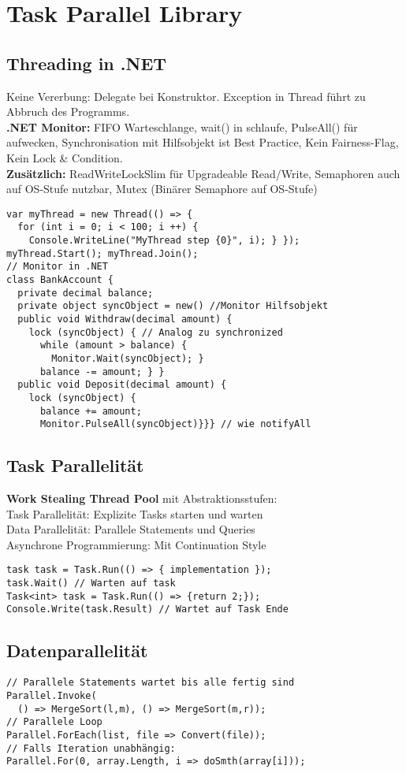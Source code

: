 
\section{Task Parallel Library}
\subsection{Threading in .NET}
Keine Vererbung: Delegate bei Konstruktor. Exception in Thread führt zu Abbruch des Programms.\\
\textcolor{b}{\textbf{.NET Monitor:}} FIFO Warteschlange, \textcolor{b}{wait()} in schlaufe, \textcolor{b}{PulseAll()} für aufwecken, Synchronisation mit Hilfsobjekt ist Best Practice, Kein Fairness-Flag, Kein Lock \& Condition.\\
\textcolor{b}{\textbf{Zusätzlich:}} ReadWriteLockSlim für Upgradeable Read/Write, Semaphoren auch auf OS-Stufe nutzbar, Mutex (Binärer Semaphore auf OS-Stufe)
\begin{lstlisting}
var myThread = new Thread(() => {
  for (int i = 0; i < 100; i ++) {
    Console.WriteLine("MyThread step {0}", i); } });
myThread.Start(); myThread.Join();
// Monitor in .NET
class BankAccount {
  private decimal balance;
  private object syncObject = new() //Monitor Hilfsobjekt
  public void Withdraw(decimal amount) {
    lock (syncObject) { // Analog zu synchronized
      while (amount > balance) {
        Monitor.Wait(syncObject); }
      balance -= amount; } }
  public void Deposit(decimal amount) {
    lock (syncObject) {
      balance += amount;
      Monitor.PulseAll(syncObject)}}} // wie notifyAll
\end{lstlisting}
\subsection{Task Parallelität}
\textcolor{b}{\textbf{Work Stealing Thread Pool}} mit Abstraktionsstufen:\\
Task Parallelität: Explizite Tasks starten und warten\\
Data Parallelität: Parallele Statements und Queries\\
Asynchrone Programmierung: Mit Continuation Style
\begin{lstlisting}
task task = Task.Run(() => { implementation });
task.Wait() // Warten auf task
Task<int> task = Task.Run(() => {return 2;});
Console.Write(task.Result) // Wartet auf Task Ende
\end{lstlisting}
\subsection{Datenparallelität}
\begin{lstlisting}
// Parallele Statements wartet bis alle fertig sind
Parallel.Invoke(
  () => MergeSort(l,m), () => MergeSort(m,r));
// Parallele Loop
Parallel.ForEach(list, file => Convert(file));
// Falls Iteration unabhängig:
Parallel.For(0, array.Length, i => doSmth(array[i]));
\end{lstlisting}
